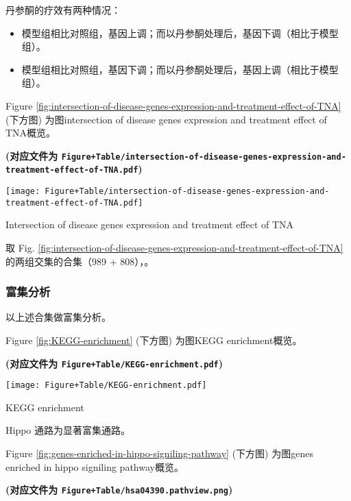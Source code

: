 \documentclass[
]{article}
\providecommand{\tightlist}{%
  \setlength{\itemsep}{0pt}\setlength{\parskip}{0pt}}
\begin{document}
丹参酮的疗效有两种情况：

\begin{itemize}
\tightlist
\item
  模型组相比对照组，基因上调；而以丹参酮处理后，基因下调（相比于模型组）。
\item
  模型组相比对照组，基因下调；而以丹参酮处理后，基因上调（相比于模型组）。
\end{itemize}

Figure \ref{fig:intersection-of-disease-genes-expression-and-treatment-effect-of-TNA} (下方图) 为图intersection of disease genes expression and treatment effect of TNA概览。

\textbf{(对应文件为 \texttt{Figure+Table/intersection-of-disease-genes-expression-and-treatment-effect-of-TNA.pdf})}

\def\@captype{figure}
\begin{center}
\texttt{[image: Figure+Table/intersection-of-disease-genes-expression-and-treatment-effect-of-TNA.pdf]}
\caption{Intersection of disease genes expression and treatment effect of TNA}\label{fig:intersection-of-disease-genes-expression-and-treatment-effect-of-TNA}
\end{center}

取 Fig. \ref{fig:intersection-of-disease-genes-expression-and-treatment-effect-of-TNA} 的两组交集的合集（989 + 808），。

\hypertarget{ux5bccux96c6ux5206ux6790}{%
\subsubsection{富集分析}\label{ux5bccux96c6ux5206ux6790}}

以上述合集做富集分析。

Figure \ref{fig:KEGG-enrichment} (下方图) 为图KEGG enrichment概览。

\textbf{(对应文件为 \texttt{Figure+Table/KEGG-enrichment.pdf})}

\def\@captype{figure}
\begin{center}
\texttt{[image: Figure+Table/KEGG-enrichment.pdf]}
\caption{KEGG enrichment}\label{fig:KEGG-enrichment}
\end{center}

Hippo 通路为显著富集通路。

Figure \ref{fig:genes-enriched-in-hippo-signiling-pathway} (下方图) 为图genes enriched in hippo signiling pathway概览。

\textbf{(对应文件为 \texttt{Figure+Table/hsa04390.pathview.png})}
\end{document}
